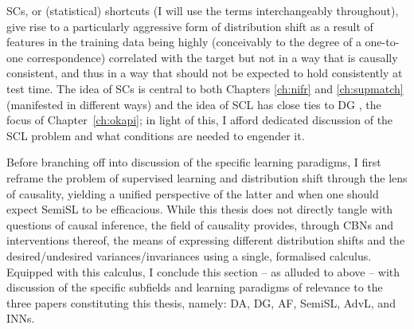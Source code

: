 %
\acp{SC}, or (statistical) shortcuts (I will use the terms interchangeably throughout), give rise
to a particularly aggressive form of distribution shift as a result of features in the training
data being highly (conceivably to the degree of a one-to-one correspondence) correlated with the
target but not in a way that is causally consistent, and thus in a way that should not be expected
to hold consistently at test time. 
%
The idea of \acp{SC} is central to both Chapters \ref{ch:nifr} and \ref{ch:supmatch} (manifested in
different ways) and the idea of \ac{SCL} has close ties to \ac{DG} \citep{arjovsky2019invariant},
the focus of Chapter~\ref{ch:okapi}; in light of this, I afford dedicated discussion of the
\ac{SCL} problem and what conditions are needed to engender it.

%
Before branching off into discussion of the specific learning paradigms, I first reframe the
problem of supervised learning and distribution shift through the lens of causality, yielding a
unified perspective of the latter and when one should expect \ac{SemiSL} to be efficacious.
%
While this thesis does not directly tangle with questions of causal inference, the field of
causality \citep{pearl2009causality} provides, through \acp{CBN} and interventions thereof, the
means of expressing different distribution shifts and the desired/undesired variances/invariances
using a single, formalised calculus.
%
Equipped with this calculus, I conclude this section -- as alluded to above -- with discussion of
the specific subfields and learning paradigms of relevance to the three papers constituting this
thesis, namely:  \ac{DA}, \ac{DG}, \ac{AF}, \ac{SemiSL}, \ac{AdvL}, and \acp{INN}.

